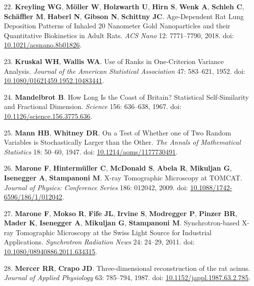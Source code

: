 \documentclass[
  american,
]{article}
\newenvironment{cslreferences}%
  {}%
  {\par}
\begin{document}
\begin{cslreferences}
\leavevmode\hypertarget{ref-18DcNLAv6}{}%
22. \textbf{Kreyling WG}, \textbf{Möller W}, \textbf{Holzwarth U}, \textbf{Hirn S}, \textbf{Wenk A}, \textbf{Schleh C}, \textbf{Schäffler M}, \textbf{Haberl N}, \textbf{Gibson N}, \textbf{Schittny JC}. Age-Dependent Rat Lung Deposition Patterns of Inhaled 20 Nanometer Gold Nanoparticles and their Quantitative Biokinetics in Adult Rats. \emph{ACS Nano} 12: 7771--7790, 2018. doi: \href{https://doi.org/10.1021/acsnano.8b01826}{10.1021/acsnano.8b01826}.

\leavevmode\hypertarget{ref-ON1Bppkk}{}%
23. \textbf{Kruskal WH}, \textbf{Wallis WA}. Use of Ranks in One-Criterion Variance Analysis. \emph{Journal of the American Statistical Association} 47: 583--621, 1952. doi: \href{https://doi.org/10.1080/01621459.1952.10483441}{10.1080/01621459.1952.10483441}.

\leavevmode\hypertarget{ref-AdXhaEV4}{}%
24. \textbf{Mandelbrot B}. How Long Is the Coast of Britain? Statistical Self-Similarity and Fractional Dimension. \emph{Science} 156: 636--638, 1967. doi: \href{https://doi.org/10.1126/science.156.3775.636}{10.1126/science.156.3775.636}.

\leavevmode\hypertarget{ref-MyzxBJ57}{}%
25. \textbf{Mann HB}, \textbf{Whitney DR}. On a Test of Whether one of Two Random Variables is Stochastically Larger than the Other. \emph{The Annals of Mathematical Statistics} 18: 50--60, 1947. doi: \href{https://doi.org/10.1214/aoms/1177730491}{10.1214/aoms/1177730491}.

\leavevmode\hypertarget{ref-knMAkPPz}{}%
26. \textbf{Marone F}, \textbf{Hintermüller C}, \textbf{McDonald S}, \textbf{Abela R}, \textbf{Mikuljan G}, \textbf{Isenegger A}, \textbf{Stampanoni M}. X-ray Tomographic Microscopy at TOMCAT. \emph{Journal of Physics: Conference Series} 186: 012042, 2009. doi: \href{https://doi.org/10.1088/1742-6596/186/1/012042}{10.1088/1742-6596/186/1/012042}.

\leavevmode\hypertarget{ref-Cp0VRmEj}{}%
27. \textbf{Marone F}, \textbf{Mokso R}, \textbf{Fife JL}, \textbf{Irvine S}, \textbf{Modregger P}, \textbf{Pinzer BR}, \textbf{Mader K}, \textbf{Isenegger A}, \textbf{Mikuljan G}, \textbf{Stampanoni M}. Synchrotron-based X-ray Tomographic Microscopy at the Swiss Light Source for Industrial Applications. \emph{Synchrotron Radiation News} 24: 24--29, 2011. doi: \href{https://doi.org/10.1080/08940886.2011.634315}{10.1080/08940886.2011.634315}.

\leavevmode\hypertarget{ref-c3aIB7f9}{}%
28. \textbf{Mercer RR}, \textbf{Crapo JD}. Three-dimensional reconstruction of the rat acinus. \emph{Journal of Applied Physiology} 63: 785--794, 1987. doi: \href{https://doi.org/10.1152/jappl.1987.63.2.785}{10.1152/jappl.1987.63.2.785}.


\end{cslreferences}
\end{document}
